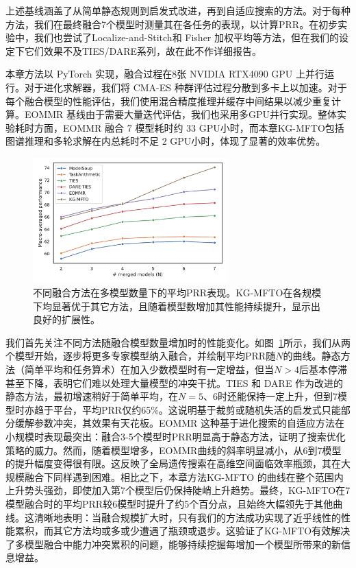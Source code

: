 \documentclass[../main.tex]{subfiles}
\begin{document}
上述基线涵盖了从简单静态规则到启发式改进，再到自适应搜索的方法。对于每种方法，我们在最终融合7个模型时测量其在各任务的表现，以计算PRR。在初步实验中，我们也尝试了Localize-and-Stitch和 Fisher 加权平均等方法，但在我们的设定下它们效果不及TIES/DARE系列，故在此不作详细报告。


本章方法以 PyTorch 实现，融合过程在8张 NVIDIA RTX4090 GPU 上并行运行。对于进化求解器，我们将 CMA-ES 种群评估过程分散到多卡上以加速。对于每个融合模型的性能评估，我们使用混合精度推理并缓存中间结果以减少重复计算。EOMMR 基线由于需要大量迭代评估，我们也采用多GPU并行实现。整体实验耗时方面，EOMMR 融合 7 模型耗时约 33 GPU小时，而本章KG-MFTO包括图谱推理和多轮求解在内总耗时不足 2 GPU小时，体现了显著的效率优势。


\begin{figure}
	\centering
	\includegraphics[width=0.67\textwidth]{KG-MFTO/figure1_perf_scaling.pdf}
	\caption{不同融合方法在多模型数量下的平均PRR表现。KG-MFTO在各规模下均显著优于其它方法，且随着模型数增加其性能持续提升，显示出良好的扩展性。}
	\label{fig:merge-performance-vs-num-models}
\end{figure}

我们首先关注不同方法随融合模型数量增加时的性能变化。如图~\ref{fig:merge-performance-vs-num-models}所示，我们从两个模型开始，逐步将更多专家模型纳入融合，并绘制平均PRR随$N$的曲线。静态方法（简单平均和任务算术）在加入少数模型时有一定增益，但当$N>4$后基本停滞甚至下降，表明它们难以处理大量模型的冲突干扰。TIES 和 DARE 作为改进的静态方法，最初增速稍好于简单平均，在$N=5$、6时还能保持一定上升，但到7模型时亦趋于平台，平均PRR仅约65\%。这说明基于裁剪或随机失活的启发式只能部分缓解参数冲突，其效果有天花板。EOMMR 这种基于进化搜索的自适应方法在小规模时表现最突出：融合3-5个模型时PRR明显高于静态方法，证明了搜索优化策略的威力。然而，随着模型增多，EOMMR曲线的斜率明显减小，从6到7模型的提升幅度变得很有限。这反映了全局遗传搜索在高维空间面临效率瓶颈，其在大规模融合下同样遇到困难。相比之下，本章方法KG-MFTO 的曲线在整个范围内上升势头强劲，即使加入第7个模型后仍保持陡峭上升趋势。最终，KG-MFTO在7模型融合时的平均PRR较6模型时提升了约5个百分点，且始终大幅领先于其他曲线。这清晰地表明：当融合规模扩大时，只有我们的方法成功实现了近乎线性的性能累积，而其它方法均或多或少遭遇了瓶颈或退步。这验证了KG-MFTO有效解决了多模型融合中能力冲突累积的问题，能够持续挖掘每增加一个模型所带来的新信息增益。
\end{document}
